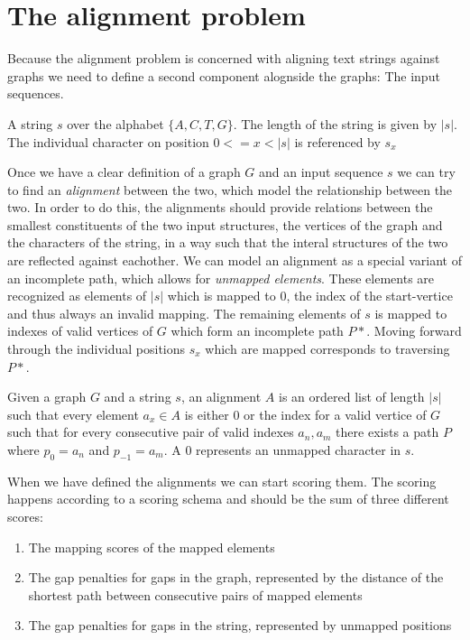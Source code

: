 \documentclass[thesis.tex]{subfiles}
\begin{document}
\section{The alignment problem}
{\parindent0pt
Because the alignment problem is concerned with aligning text strings against graphs we need to define a second component alognside the graphs: The input sequences.
\begin{defn}
  A string $s$ over the alphabet $\{A, C, T, G\}$. The length of the string is given by $|s|$. The individual character on position $0<=x<|s|$ is referenced by $s_x$
\end{defn}
Once we have a clear definition of a graph $G$ and an input sequence $s$ we can try to find an \textit{alignment} between the two, which model the relationship between the two. In order to do this, the alignments should provide relations between the smallest constituents of the two input structures, the vertices of the graph and the characters of the string, in a way such that the interal structures of the two are reflected against eachother. We can model an alignment as a special variant of an incomplete path, which allows for \textit{unmapped elements}. These elements are recognized as elements of $|s|$ which is mapped to $0$, the index of the start-vertice and thus always an invalid mapping. The remaining elements of $s$ is mapped to indexes of valid vertices of $G$ which form an incomplete path $P*$. Moving forward through the individual positions $s_x$ which are mapped corresponds to traversing $P*$.
\begin{defn}[Alignment]
  Given a graph $G$ and a string $s$, an alignment $A$ is an ordered list of length $|s|$ such that every element $a_x \in A$ is either $0$ or the index for a valid vertice of $G$ such that for every consecutive pair of valid indexes $a_n, a_m$ there exists a path $P$ where $p_0=a_n$ and $p_{-1}=a_m$. A $0$ represents an unmapped character in $s$.
\end{defn}
When we have defined the alignments we can start scoring them. The scoring happens according to a scoring schema and should be the sum of three different scores:
\begin{enumerate}
  \item The mapping scores of the mapped elements
  \item The gap penalties for gaps in the graph, represented by the distance of the shortest path between consecutive pairs of mapped elements
  \item The gap penalties for gaps in the string, represented by unmapped positions

\end{enumerate}}
\end{document}
